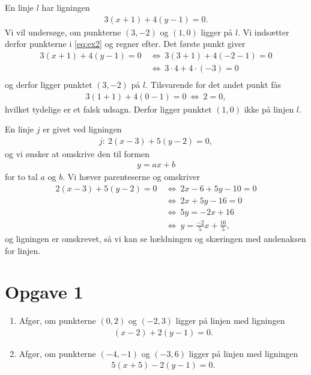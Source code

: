 \begin{exa}
En linje $l$ har ligningen 
\begin{align}\label{eq:ex2}
	3(x+1) + 4(y-1) = 0.
\end{align}
Vi vil undersøge, om punkterne $(3,-2)$ og $(1,0)$ ligger på $l$. Vi indsætter derfor punkterne i \eqref{eq:ex2} og regner efter. Det første punkt giver
\begin{align*}
3(x+1) + 4(y-1) = 0 \ &\Leftrightarrow \  3(3+1) + 4(-2-1) = 0 \\
& \Leftrightarrow \ 3\cdot 4+4\cdot(-3) = 0\\
\end{align*}
og derfor ligger punktet $(3,-2)$ på $l$. Tilsvarende for det andet punkt fås
\begin{align*}
3(1+1) + 4(0-1) = 0 \  \Leftrightarrow \ 2 = 0, 
\end{align*}
hvilket tydelige er et falsk udsagn. Derfor ligger punktet $(1,0)$ ikke på linjen $l$. 
\end{exa}
\begin{exa}
	En linje $j$ er givet ved ligningen
	\begin{align*}
		j:\ 2(x-3) + 5(y-2) = 0,
	\end{align*}
	og vi ønsker at omskrive den til formen
	\begin{align*}
		y = ax + b
	\end{align*}
	for to tal $a$ og $b$. Vi hæver parenteserne og omskriver
	\begin{align*}
		2(x-3) + 5(y-2) = 0 \ &\Leftrightarrow \ 2x - 6 + 5y - 10 = 0\\
		&\Leftrightarrow	\ 2x + 5y - 16 = 0 \\
		&\Leftrightarrow \ 5y = -2x + 16 \\
		&\Leftrightarrow \ y = \frac{-2}{5}x + \frac{16}{5},
	\end{align*}
	og ligningen er omskrevet, så vi kan se hældningen og skæringen med andenaksen for linjen. 
\end{exa}


\section*{Opgave 1}
\begin{enumerate}[label=\roman*)]
\item Afgør, om punkterne $(0,2)$ og $(-2,3)$ ligger på linjen med ligningen
\begin{align*}
	(x-2) + 2(y-1) = 0.
\end{align*}
\item Afgør, om punkterne $(-4,-1)$ og $(-3,6)$ ligger på linjen med ligningen 
\begin{align*}
	5(x+5) - 2(y-1) = 0.
\end{align*}
\end{enumerate}

